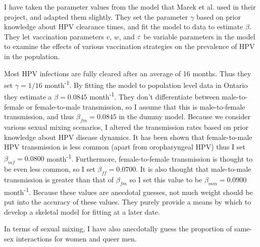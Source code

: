 \documentclass[12pt]{article}
\begin{document}
I have taken the parameter values from the model that Marek et al. used in their project, and adapted them slightly. They set the parameter $\gamma$ based on prior knowledge about HPV clearance times, and fit the model to data to estimate $\beta$. They let vaccination parameters $v$, $w$, and $\varepsilon$ be variable parameters in the model to examine the effects of various vaccination strategies on the prevalence of HPV in the population.

Most HPV infections are fully cleared after an average of 16 months.  Thus they set $\gamma=1/16$ month\textsuperscript{-1}.  By fitting the model to population level data in Ontario they estimate a $\beta=0.0845$ month\textsuperscript{-1}.  They don't differentiate between male-to-female or female-to-male transmission, so I assume that this is male-to-female transmission, and thus $\beta_{fm}=0.0845$ in the dummy model.  Because we consider various sexual mixing scenarios, I altered the transmission rates based on prior knowledge about HPV disease dynamics.  It has been shown that female-to-male HPV transmission is less common (apart from oropharyngeal HPV) thus I set $\beta_{mf}=0.0800$ month\textsuperscript{-1}.  Furthermore, female-to-female transmission is thought to be even less common, so I set $\beta_{ff}=0.0700$.  It is also thought that male-to-male transmission is greater than that of $\beta_{fm}$ so I set this value to be $\beta_{mm}=0.0900$ month\textsuperscript{-1}.  Because these values are anecdotal guesses, not much weight should be put into the accuracy of these values.  They purely provide a means by which to develop a skeletal model for fitting at a later date. 

In terms of sexual mixing, I have also anecdotally guess the proportion of same-sex interactions for women and queer men. 
\end{document}
